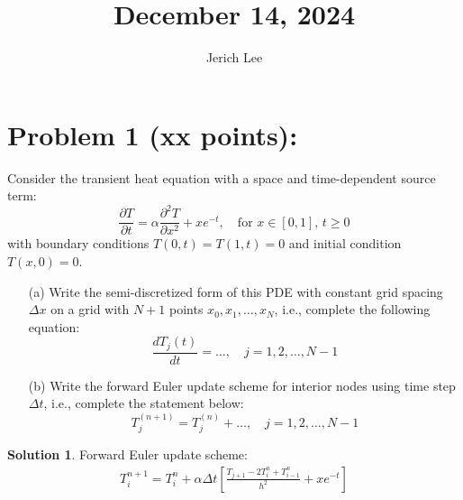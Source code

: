 \documentclass[12pt]{article}
\title{December 14, 2024}
\author{Jerich Lee}
\date{}
\theoremstyle{definition} %
\newtheorem{solution}{Solution}
\theoremstyle{plain} %
\begin{document}
\maketitle
\section*{Problem 1 (xx points):}
Consider the transient heat equation with a space and time-dependent source term:
\[
\frac{\partial T}{\partial t} = \alpha \frac{\partial^2 T}{\partial x^2} + xe^{-t}, \quad \text{for } x \in [0,1], \, t \geq 0
\]
with boundary conditions \( T(0,t) = T(1,t) = 0 \) and initial condition \( T(x,0) = 0 \).

\begin{enumerate}
    \item[(a)] Write the semi-discretized form of this PDE with constant grid spacing \(\Delta x\) on a grid with \( N + 1 \) points \( x_0, x_1, \dots, x_N \), i.e., complete the following equation:
    \[
    \frac{dT_j(t)}{dt} = \dots, \quad j = 1, 2, \dots, N-1
    \]

    \item[(b)] Write the forward Euler update scheme for interior nodes using time step \(\Delta t\), i.e., complete the statement below:
    \[
    T_j^{(n+1)} = T_j^{(n)} + \dots, \quad j = 1, 2, \dots, N-1
    \]
\end{enumerate}

\begin{solution}
  Forward Euler update scheme:
  \begin{align}
    T_i^{n+1}=T_i^{n}+\alpha \Delta t \left[\frac{T_{j+1}-2T_i^{n}+T_{i-1}^{n}}{h^{2}}+xe^{-t}\right]
  \end{align}  
\end{solution}
\end{document}
